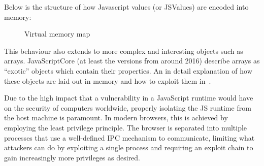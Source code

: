 \documentclass{article}
\begin{document}
Below is the structure of how Javascript values (or JSValues) are encoded into memory:
\begin{figure}[H]%
  \centering
  \caption{\label{fig:memorymap} Virtual memory map}%
\end{figure}
This behaviour also extends to more complex and interesting objects such as arrays. JavaScriptCore (at least the versions from around 2016) describe arrays as ``exotic'' objects which contain their properties. An in detail explanation of how these objects are laid out in memory and how to exploit them in~\cite{saelo2016}.


Due to the high impact that a vulnerability in a JavaScript runtime would have on the security of computers worldwide, properly isolating the JS runtime from the host machine is paramount. In modern browsers, this is achieved by employing the least privilege principle. The browser is separated into multiple processes that use a well-defined IPC mechanism to communicate, limiting what attackers can do by exploiting a single process and requiring an exploit chain to gain increasingly more privileges as desired.
\end{document}
